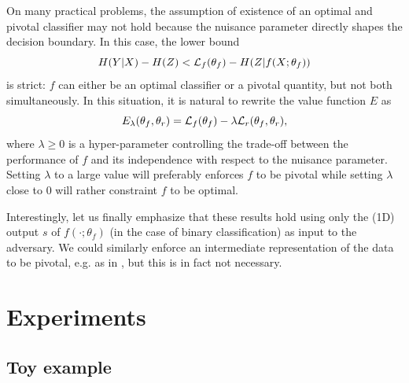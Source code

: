 \documentclass[twocolumn,superscriptaddress,aps]{revtex4-1}
\theoremstyle{plain}
\begin{document}
On many practical problems, the assumption of existence of an optimal and pivotal classifier may
not hold because the nuisance parameter directly shapes the decision boundary.
In this case, the lower bound $$ H({Y|X}) - H(Z) < {\cal L}_f(\theta_f) - H({Z|f(X;\theta_f)})$$ is strict: $f$ can either be an optimal classifier or a
pivotal quantity, but not both simultaneously. In this situation, it is natural
to rewrite the value function $E$  as
\begin{equation}\label{eqn:vf-lambda}
    E_\lambda(\theta_f, \theta_r) = {\cal L}_f(\theta_f) - \lambda {\cal L}_r(\theta_f, \theta_r),
\end{equation}
where $\lambda \geq 0$ is a hyper-parameter controlling the trade-off between
the performance of $f$ and its independence with respect to the nuisance
parameter. Setting $\lambda$ to a large value will preferably enforces $f$ to
be pivotal while setting $\lambda$ close to $0$ will rather constraint $f$ to be
optimal.

Interestingly, let us finally emphasize that these results hold using only the (1D) output $s$
of $f(\cdot;\theta_f)$ (in the case of binary classification) as input to the adversary. We
could similarly enforce an intermediate representation of the data to be
pivotal, e.g. as in \citep{ganin2014unsupervised}, but this is in fact not
necessary.



\section{Experiments}

\subsection{Toy example}
\label{sec:toy}
\end{document}

